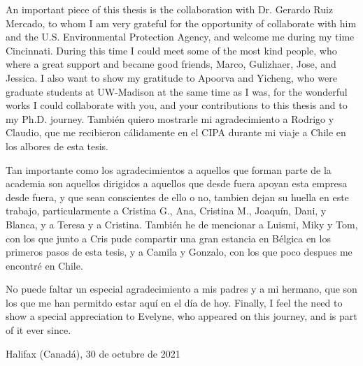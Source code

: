 An important piece of this thesis is the collaboration with Dr. Gerardo Ruiz Mercado, to whom I am very grateful for the opportunity of collaborate with him and the U.S. Environmental Protection Agency, and welcome me during my time Cincinnati. During this time I could meet some of the most kind people, who where a great support and became good friends, Marco, Gulizhaer, Jose, and Jessica. I also want to show my gratitude to Apoorva and Yicheng, who were graduate students at UW-Madison at the same time as I was, for the wonderful works I could collaborate with you, and your contributions to this thesis and to my Ph.D. journey. También quiero mostrarle mi agradecimiento a Rodrigo y Claudio, que me recibieron cálidamente en el CIPA durante mi viaje a Chile en los albores de esta tesis. 

Tan importante como los agradecimientos a aquellos que forman parte de la academia son aquellos dirigidos a aquellos que desde fuera apoyan esta empresa desde fuera, y que sean conscientes de ello o no, tambien dejan su huella en este trabajo, particularmente a Cristina G., Ana, Cristina M., Joaquín, Dani, y Blanca, y a Teresa y a Cristina. También he de mencionar a Luismi, Miky y Tom, con los que junto a Cris pude compartir una gran estancia en Bélgica en los primeros pasos de esta tesis, y a Camila y Gonzalo, con los que poco despues me encontré en Chile. 

No puede faltar un especial agradecimiento a mis padres y a mi hermano, que son los que me han permitdo estar aquí en el día de hoy. Finally, I feel the need to show a special appreciation to Evelyne, who appeared on this journey, and is part of it ever since.

\bigskip

\hspace*{\fill} Halifax (Canadá), 30 de octubre de 2021

\endgroup
